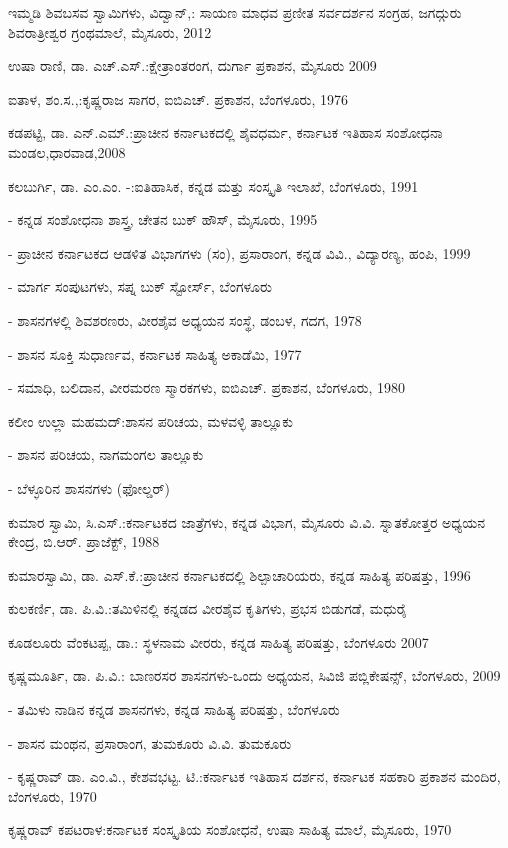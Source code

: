 \noindent
ಇಮ್ಮಡಿ ಶಿವಬಸವ ಸ್ವಾಮಿಗಳು, ವಿದ್ವಾನ್​,: ಸಾಯಣ ಮಾಧವ ಪ್ರಣೀತ ಸರ್ವದರ್ಶನ ಸಂಗ್ರಹ, ಜಗದ್ಗುರು ಶಿವರಾತ್ರೀಶ್ವರ ಗ್ರಂಥಮಾಲೆ, ಮೈಸೂರು, 2012

\noindent
ಉಷಾ ರಾಣಿ, ಡಾ. ಎಚ್​.ಎಸ್​.:ಕ್ಷೇತ್ರಾಂತರಂಗ, ದುರ್ಗಾ ಪ್ರಕಾಶನ, ಮೈಸೂರು 2009

\noindent
ಐತಾಳ, ಶಂ.ಸ.,:ಕೃಷ್ಣರಾಜ ಸಾಗರ, ಐಬಿಎಚ್​. ಪ್ರಕಾಶನ, ಬೆಂಗಳೂರು, 1976

\noindent
ಕಡಪಟ್ಟಿ, ಡಾ. ಎನ್​.ಎಮ್.:ಪ್ರಾಚೀನ ಕರ್ನಾಟಕದಲ್ಲಿ ಶೈವಧರ್ಮ, ಕರ್ನಾಟಕ ಇತಿಹಾಸ ಸಂಶೋಧನಾ ಮಂಡಲ,\break ಧಾರವಾಡ,2008

\noindent
ಕಲಬುರ್ಗಿ, ಡಾ. ಎಂ.ಎಂ. -:ಐತಿಹಾಸಿಕ, ಕನ್ನಡ ಮತ್ತು ಸಂಸ್ಕೃತಿ ಇಲಾಖೆ, ಬೆಂಗಳೂರು, 1991

- ಕನ್ನಡ ಸಂಶೋಧನಾ ಶಾಸ್ತ್ರ, ಚೇತನ ಬುಕ್​ ಹೌಸ್​, ಮೈಸೂರು, 1995

- ಪ್ರಾಚೀನ ಕರ್ನಾಟಕದ ಆಡಳಿತ ವಿಭಾಗಗಳು (ಸಂ), ಪ್ರಸಾರಾಂಗ, ಕನ್ನಡ ವಿವಿ., ವಿದ್ಯಾರಣ್ಯ, ಹಂಪಿ, 1999

- ಮಾರ್ಗ ಸಂಪುಟಗಳು, ಸಪ್ನ ಬುಕ್​ ಸ್ಟೋರ್ಸ್, ಬೆಂಗಳೂರು 

- ಶಾಸನಗಳಲ್ಲಿ ಶಿವಶರಣರು, ವೀರಶೈವ ಅಧ್ಯಯನ ಸಂಸ್ಥೆ, ಡಂಬಳ, ಗದಗ, 1978

- ಶಾಸನ ಸೂಕ್ತಿ ಸುಧಾರ್ಣವ, ಕರ್ನಾಟಕ ಸಾಹಿತ್ಯ ಅಕಾಡೆಮಿ, 1977

- ಸಮಾಧಿ, ಬಲಿದಾನ, ವೀರಮರಣ ಸ್ಮಾರಕಗಳು, ಐಬಿಎಚ್​. ಪ್ರಕಾಶನ, ಬೆಂಗಳೂರು, 1980

\noindent
ಕಲೀಂ ಉಲ್ಲಾ ಮಹಮದ್​:ಶಾಸನ ಪರಿಚಯ, ಮಳವಳ್ಳಿ ತಾಲ್ಲೂಕು

- ಶಾಸನ ಪರಿಚಯ, ನಾಗಮಂಗಲ ತಾಲ್ಲೂಕು

- ಬೆಳ್ಳೂರಿನ ಶಾಸನಗಳು (ಫೋಲ್ಡರ್​)

\noindent
ಕುಮಾರ ಸ್ವಾಮಿ, ಸಿ.ಎಸ್​.:ಕರ್ನಾಟಕದ ಜಾತ್ರೆಗಳು, ಕನ್ನಡ ವಿಭಾಗ, ಮೈಸೂರು ವಿ.ವಿ. ಸ್ನಾತಕೋತ್ತರ ಅಧ್ಯಯನ ಕೇಂದ್ರ, ಬಿ.ಆರ್​. ಪ್ರಾಜೆಕ್ಟ್​, 1988

\noindent
ಕುಮಾರಸ್ವಾಮಿ, ಡಾ. ಎಸ್​.ಕೆ.:ಪ್ರಾಚೀನ ಕರ್ನಾಟಕದಲ್ಲಿ ಶಿಲ್ಪಾಚಾರಿಯರು, ಕನ್ನಡ ಸಾಹಿತ್ಯ ಪರಿಷತ್ತು, 1996

\noindent
ಕುಲಕರ್ಣಿ, ಡಾ. ಪಿ.ವಿ.:ತಮಿಳಿನಲ್ಲಿ ಕನ್ನಡದ ವೀರಶೈವ ಕೃತಿಗಳು, ಪ್ರಭಸ ಬಿಡುಗಡೆ, ಮಧುರೈ

\noindent
ಕೂಡಲೂರು ವೆಂಕಟಪ್ಪ, ಡಾ.: ಸ್ಥಳನಾಮ ವೀರರು, ಕನ್ನಡ ಸಾಹಿತ್ಯ ಪರಿಷತ್ತು, ಬೆಂಗಳೂರು 2007

\noindent
ಕೃಷ್ಣಮೂರ್ತಿ, ಡಾ. ಪಿ.ವಿ.: ಬಾಣರಸರ ಶಾಸನಗಳು-ಒಂದು ಅಧ್ಯಯನ, ಸಿವಿಜಿ ಪಬ್ಲಿಕೇಷನ್ಸ್​, ಬೆಂಗಳೂರು, 2009

- ತಮಿಳು ನಾಡಿನ ಕನ್ನಡ ಶಾಸನಗಳು, ಕನ್ನಡ ಸಾಹಿತ್ಯ ಪರಿಷತ್ತು, ಬೆಂಗಳೂರು

- ಶಾಸನ ಮಂಥನ, ಪ್ರಸಾರಾಂಗ, ತುಮಕೂರು ವಿ.ವಿ. ತುಮಕೂರು

- ಕೃಷ್ಣರಾವ್​ ಡಾ. ಎಂ.ವಿ., ಕೇಶವಭಟ್ಟ. ಟಿ.:ಕರ್ನಾಟಕ ಇತಿಹಾಸ ದರ್ಶನ, ಕರ್ನಾಟಕ ಸಹಕಾರಿ ಪ್ರಕಾಶನ ಮಂದಿರ, ಬೆಂಗಳೂರು, 1970

\noindent
ಕೃಷ್ಣರಾವ್​ ಕಪಟರಾಳ:ಕರ್ನಾಟಕ ಸಂಸ್ಕೃತಿಯ ಸಂಶೋಧನೆ, ಉಷಾ ಸಾಹಿತ್ಯ ಮಾಲೆ, ಮೈಸೂರು, 1970

